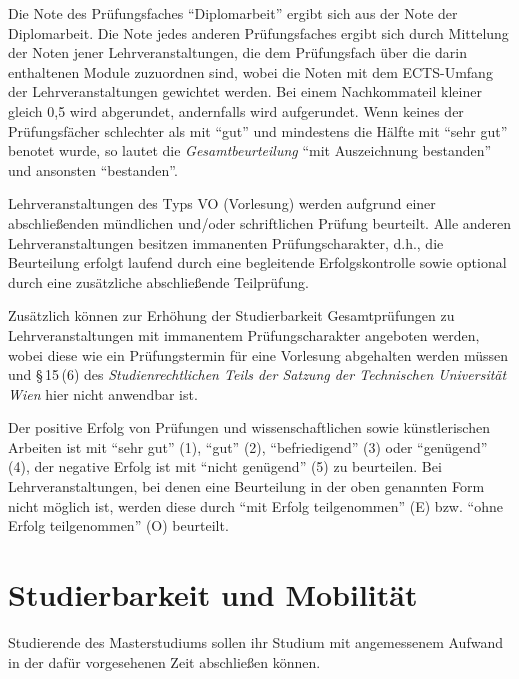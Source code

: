 Die Note des Prüfungsfaches "`Diplomarbeit"' ergibt sich aus der 
Note der Diplomarbeit. Die Note jedes anderen Prüfungsfaches 
ergibt sich durch Mittelung der Noten
jener Lehrveranstaltungen, die dem Prüfungsfach über die darin
enthaltenen Module zuzuordnen sind, wobei die Noten mit dem
ECTS-Umfang der Lehrveranstaltungen gewichtet werden. Bei einem
Nachkommateil kleiner gleich 0,5 wird abgerundet, andernfalls
wird aufgerundet. Wenn keines der Prüfungsfächer schlechter als mit 
"`gut"' und mindestens die Hälfte mit "`sehr gut"' benotet wurde, so 
lautet die \emph{Gesamtbeurteilung} "`mit Auszeichnung bestanden"' 
und ansonsten "`bestanden"'. 

Lehrveranstaltungen des Typs VO (Vorlesung) werden aufgrund einer
abschließenden mündlichen und/oder schriftlichen Prüfung
beurteilt. Alle anderen Lehrveranstaltungen besitzen immanenten
Prüfungscharakter, d.h., die Beurteilung erfolgt laufend durch eine
begleitende Erfolgskontrolle sowie optional durch eine zusätzliche
abschließende Teilprüfung.

Zusätzlich können zur Erhöhung der Studierbarkeit Gesamtprüfungen zu
Lehrveranstaltungen mit immanentem Prüfungscharakter angeboten werden,
wobei diese wie ein Prüfungstermin für eine Vorlesung abgehalten
werden müssen und \S\,15\,(6) des \emph{Studienrechtlichen Teils der 
Satzung der Technischen Universität Wien} hier nicht anwendbar ist.

Der positive Erfolg von Prüfungen und wissenschaftlichen sowie 
künstlerischen Arbeiten ist mit "`sehr gut"' (1), "`gut"'
(2), "`befriedigend"' (3) oder "`genügend"' (4), der negative Erfolg
ist mit "`nicht genügend"' (5) zu beurteilen. Bei Lehrveranstaltungen, 
bei denen eine Beurteilung in der oben genannten Form nicht möglich ist, 
werden diese durch "`mit Erfolg teilgenommen"' (E) bzw. 
"`ohne Erfolg teilgenommen"' (O) beurteilt.

%

\section{Studierbarkeit und Mobilität}\label{sec:SM}

Studierende des Masterstudiums \emph{} sollen ihr
Studium mit angemessenem Aufwand in der dafür vorgesehenen Zeit
abschließen können.

%

